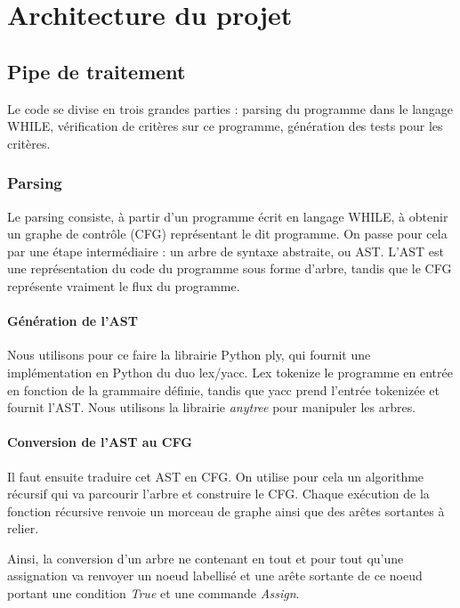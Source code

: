 \chapter{Architecture du projet}

\section{Pipe de traitement}

Le code se divise en trois grandes parties : parsing du programme dans le langage WHILE, vérification de critères sur ce programme, génération des tests pour les critères.

\subsection{Parsing}

Le parsing consiste, à partir d'un programme écrit en langage WHILE, à obtenir un graphe de contrôle (CFG) représentant le dit programme. On passe pour cela par une étape intermédiaire : un arbre de syntaxe abstraite, ou AST. L'AST est une représentation du code du programme sous forme d'arbre, tandis que le CFG représente vraiment le flux du programme.


\subsubsection{Génération de l'AST}

Nous utilisons pour ce faire la librairie Python ply, qui fournit une implémentation en Python du duo lex/yacc. Lex tokenize le programme en entrée en fonction de la grammaire définie, tandis que yacc prend l'entrée tokenizée et fournit l'AST. Nous utilisons la librairie \textit{anytree} pour manipuler les arbres.

\subsubsection{Conversion de l'AST au CFG}

Il faut ensuite traduire cet AST en CFG. On utilise pour cela un algorithme récursif qui va parcourir l'arbre et construire le CFG. Chaque exécution de la fonction récursive renvoie un morceau de graphe ainsi que des arêtes sortantes à relier.

Ainsi, la conversion d'un arbre ne contenant en tout et pour tout qu'une assignation va renvoyer un noeud labellisé et une arête sortante de ce noeud portant une condition \textit{True} et une commande \textit{Assign}.

